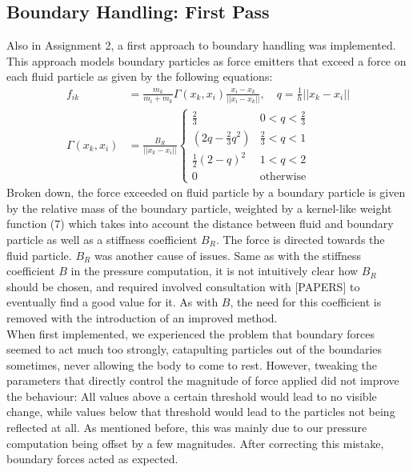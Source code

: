 \documentclass{ACGSeminar}
\begin{document}
\subsection{Boundary Handling: First Pass}

Also in Assignment 2, a first approach to boundary handling was implemented. This approach models boundary particles as force emitters that exceed a force on each fluid particle as given by the following equations:\\
\begin{equation}
\begin{aligned}
f_{ik} &= \frac{m_k}{m_i + m_k} \Gamma(x_k, x_i) \frac{x_i - x_k}{||x_i - x_k||}, \quad q = \frac{1}{h}||x_k - x_i|| \\
\Gamma (x_k, x_i) &= \frac{B_R}{||x_k - x_i||} 
\begin{cases}
\frac{2}{3}  & 0 < q < \frac{2}{3} \\
(2q - \frac{2}{3} q^2)  & \frac{2}{3} < q < 1 \\
\frac{1}{2}(2-q)^2 & 1<q<2 \\
0 & \text{otherwise}
\end{cases}
\end{aligned}
\end{equation}
Broken down, the force exceeded on fluid particle by a boundary particle is given by the relative mass of the boundary particle, weighted by a kernel-like weight function (7) which takes into account the distance between fluid and boundary particle as well as a stiffness coefficient \(B_R\). The force is directed towards the fluid particle.
\(B_R\) was another cause of issues. Same as with the stiffness coefficient \(B\) in the pressure computation, it is not intuitively clear how \(B_R\) should be chosen, and required involved consultation with [PAPERS] to eventually find a good value for it. As with \(B\), the need for this coefficient is removed with the introduction of an improved method. \\
When first implemented, we experienced the problem that boundary forces seemed to act much too strongly, catapulting particles out of the boundaries sometimes, never allowing the body to come to rest.
However, tweaking the parameters that directly control the magnitude of force applied did not improve the behaviour: All values above a certain threshold would lead to no visible change, while values below that threshold would lead to the particles not being reflected at all.
As mentioned before, this was mainly due to our pressure computation being offset by a few magnitudes. After correcting this mistake, boundary forces acted as expected.
\end{document}

